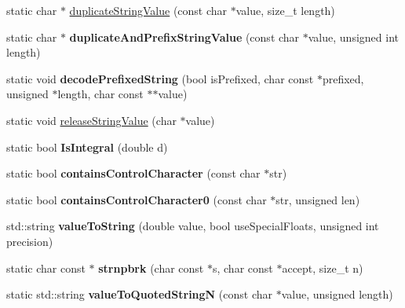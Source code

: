 \begin{DoxyCompactItemize}
\item 
static char $\ast$ \hyperlink{namespace_json_a678ac3a60cd70ec0fb4c9abfd40eb0c4}{duplicate\+String\+Value} (const char $\ast$value, size\+\_\+t length)
\item 
\hypertarget{namespace_json_a9795a09a0141d1f12d307c4386aeaee6}{}static char $\ast$ {\bfseries duplicate\+And\+Prefix\+String\+Value} (const char $\ast$value, unsigned int length)\label{namespace_json_a9795a09a0141d1f12d307c4386aeaee6}

\item 
\hypertarget{namespace_json_aad8b4982c1acd164f541fba396ac9fb1}{}static void {\bfseries decode\+Prefixed\+String} (bool is\+Prefixed, char const $\ast$prefixed, unsigned $\ast$length, char const $\ast$$\ast$value)\label{namespace_json_aad8b4982c1acd164f541fba396ac9fb1}

\item 
static void \hyperlink{namespace_json_acf8dd162c01e37846e129556c50e4037}{release\+String\+Value} (char $\ast$value)
\item 
\hypertarget{namespace_json_a1a04cc9d31e64b5912dade003c9b99b5}{}static bool {\bfseries Is\+Integral} (double d)\label{namespace_json_a1a04cc9d31e64b5912dade003c9b99b5}

\item 
\hypertarget{namespace_json_aa11b210ff98a4f4dd4e2df19260f8c3a}{}static bool {\bfseries contains\+Control\+Character} (const char $\ast$str)\label{namespace_json_aa11b210ff98a4f4dd4e2df19260f8c3a}

\item 
\hypertarget{namespace_json_ae8a357381f264cf28f46449e79ab1dea}{}static bool {\bfseries contains\+Control\+Character0} (const char $\ast$str, unsigned len)\label{namespace_json_ae8a357381f264cf28f46449e79ab1dea}

\item 
\hypertarget{namespace_json_a1c49ced79060a67638d7fa78a63b1813}{}std\+::string {\bfseries value\+To\+String} (double value, bool use\+Special\+Floats, unsigned int precision)\label{namespace_json_a1c49ced79060a67638d7fa78a63b1813}

\item 
\hypertarget{namespace_json_a7492156d0c7d2dd2f672acacfb240320}{}static char const $\ast$ {\bfseries strnpbrk} (char const $\ast$s, char const $\ast$accept, size\+\_\+t n)\label{namespace_json_a7492156d0c7d2dd2f672acacfb240320}

\item 
\hypertarget{namespace_json_a20d52b5a457ee5d833645d119451c2cd}{}static std\+::string {\bfseries value\+To\+Quoted\+String\+N} (const char $\ast$value, unsigned length)\label{namespace_json_a20d52b5a457ee5d833645d119451c2cd}


\end{DoxyCompactItemize}
